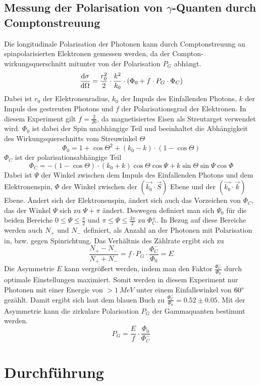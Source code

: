 \subsection{Messung der Polarisation von $\gamma$-Quanten durch Comptonstreuung}
Die longitudinale Polarisation der Photonen kann durch Comptonstreuung an spinpolarisierten Elektronen gemessen werden, da der Compton-wirkungsquerschnitt mitunter von der Polarisation $P_G$ abhängt. 
$$\odv{\sigma}{\Omega} = \frac{r_0^2}{2} \cdot \frac{k^2}{k_0} \cdot (\Phi_0 + f \cdot P_G \cdot \Phi_C)  $$
Dabei ist $r_0$ der Elektronenradius, $k_0$ der Impuls des Einfallenden Photons, $k$ der Impuls des gestreuten Photons und $f$ der Polarisationsgrad der Elektronen. In diesem Experiment gilt $f = \frac{2}{26}$, da magnetisiertes Eisen als Streutarget verwendet wird. 
$\Phi_0$ ist dabei der Spin unabhängige Teil und beeinhaltet die Abhängigkeit des Wirkungsquerschnitts vom Streuwinkel $\Theta$
$$\Phi_0 = 1 + \cos{\Theta}^2 + (k_0 - k)\cdot (1-\cos{\Theta})$$
$\Phi_C$ ist der polarisationsabhängige Teil
$$\Phi_C = -(1 -\cos{\Theta}) \cdot (k_0 + k) \cos{\Theta} \cos{\Psi}+ k \sin{\Theta} \sin{\Psi} \cos{\Phi}$$ 
Dabei ist $\Psi$ der Winkel zwischen dem Impuls des Einfallenden Photons und dem Elektronenspin, $\Phi$ der Winkel zwischen der $(\Vec{k_0}\cdot\Vec{S})$ Ebene und der $(\Vec{k_0}\cdot\Vec{k})$ Ebene.
Ändert sich der Elektronenspin, ändert sich auch das Vorzeichen von $\Phi_C$, das der Winkel $\Psi$ sich zu $\Psi + \pi$ ändert. Deswegen definiert man sich $\Psi_0$ für die beiden Bereiche $0 \leq \Psi \leq \frac{\pi}{2}$ und $\pi \leq \Psi \leq \frac{3\pi}{2}$ zu $\Phi_C^\pm$. In Bezug auf diese Bereiche werden auch $N_+$ und $N_-$ definiert, als Anzahl an der Photonen mit Polarisation in, bzw. gegen Spinrichtung. Das Verhältnis des Zählrate ergibt sich zu 
$$\frac{N_+ - N_-}{N_+ + N_-} = f \cdot P_G \cdot \frac{\Phi_C^-}{\Phi_0} = E$$
Die Asymmetrie $E$ kann vergrößert werden, indem man den Faktor $\frac{\Phi_C^-}{\Phi_0}$ durch optimale Einstellungen maximiert. Somit werden in diesem Experiment nur Photonen mit einer Energie von $> \SI{1}{MeV}$ unter einem Einfallswinkel von $60 \degree$ gezählt. Damit ergibt sich laut dem blauen Buch zu $\frac{\Phi_C^-}{\Phi_0} = 0.52 \pm 0.05$. \cite{BlueBook} 
Mit der Asymmetrie kann die zirkulare Polarisation $P_G$ der Gammaquanten bestimmt werden. 
\begin{equation}
    P_G = \frac{E}{f}\cdot \frac{\Phi_0}{\Phi_C^-}
    \label{Polarisation}
\end{equation}
\section{Durchführung}

